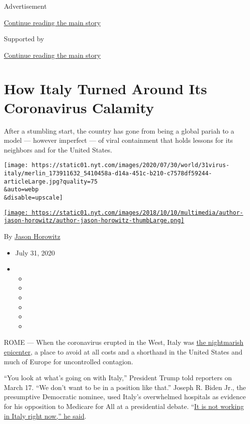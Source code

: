 Advertisement

\protect\hyperlink{after-top}{Continue reading the main story}

Supported by

\protect\hyperlink{after-sponsor}{Continue reading the main story}

\hypertarget{how-italy-turned-around-its-coronavirus-calamity}{%
\section{How Italy Turned Around Its Coronavirus
Calamity}\label{how-italy-turned-around-its-coronavirus-calamity}}

After a stumbling start, the country has gone from being a global pariah
to a model --- however imperfect --- of viral containment that holds
lessons for its neighbors and for the United States.

\texttt{[image: https://static01.nyt.com/images/2020/07/30/world/31virus-italy/merlin\_173911632\_5410458a-d14a-451c-b210-c7578df59244-articleLarge.jpg?quality=75\\\&auto=webp\\\&disable=upscale]}

\href{https://www.nytimes.com/by/jason-horowitz}{\texttt{[image: https://static01.nyt.com/images/2018/10/10/multimedia/author-jason-horowitz/author-jason-horowitz-thumbLarge.png]}}

By \href{https://www.nytimes.com/by/jason-horowitz}{Jason Horowitz}

\begin{itemize}
\item
  July 31, 2020
\item
  \begin{itemize}
  \item
  \item
  \item
  \item
  \item
  \item
  \end{itemize}
\end{itemize}

ROME --- When the coronavirus erupted in the West, Italy was
\href{https://www.nytimes.com/interactive/2020/03/27/world/europe/coronavirus-italy-bergamo.html}{the
nightmarish epicenter}, a place to avoid at all costs and a shorthand in
the United States and much of Europe for uncontrolled contagion.

``You look at what's going on with Italy,'' President Trump told
reporters on March 17. ``We don't want to be in a position like that.''
Joseph R. Biden Jr., the presumptive Democratic nominee, used Italy's
overwhelmed hospitals as evidence for his opposition to Medicare for All
at a presidential debate.
``\href{https://edition.cnn.com/politics/live-news/2020-democratic-debate-live-updates/h_501d1e381370480bd021916a86029534}{It
is not working in Italy right now,'' he said}.


